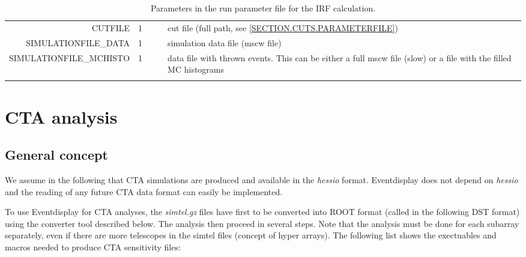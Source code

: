 \documentclass[titlepage,a4paper,twoside,11pt]{report}
\begin{document}
\begin{small}
\begin{longtable}{r  r  r r  p{3.5cm}}
CUTFILE & 1 & & & cut file (full path, see \ref{SECTION.CUTS.PARAMETERFILE}) \\

SIMULATIONFILE\_DATA & 1  & & & simulation data file (mscw file) \\

SIMULATIONFILE\_MCHISTO  & 1  & & & data file with thrown events. This can be either a full mscw file (slow) or a file with the filled MC histograms \\

\bottomrule
\caption{Parameters in the run parameter file for the IRF calculation.}
\end{longtable}
\end{small}


%
%

\chapter{CTA analysis}

\section{General concept}

We assume in the following that CTA simulations are produced and available in the {\it hessio} format. 
Eventdisplay does not depend on {\it hessio} and the reading of any future CTA data format can easily be implemented.

To use Eventdisplay for CTA analyses, the {\it simtel.gz} files have first to be converted into ROOT format (called in the following DST format) using the converter tool described below. 
The analysis then proceed in several steps.
Note that the analysis must be done for each subarray separately, even if there are more telescopes in the simtel files (concept of hyper arrays).
The following list shows the exectuables and macros needed to produce CTA sensitivity files:
\end{document}
